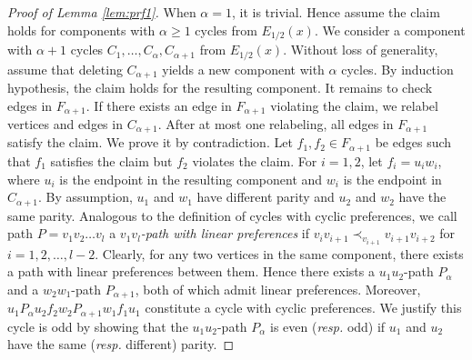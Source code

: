 \documentclass[11pt]{article}
\numberwithin{theorem}{section}
\begin{document}
\begin{proof}[Proof of Lemma \ref{lem:prf1}]
When $\alpha=1$, it is trivial.
Hence assume the claim holds for components with $\alpha\geq 1$ cycles from $E_{1/2}(x)$. We consider a component with $\alpha +1$ cycles $C_1, \ldots, C_{\alpha}, C_{\alpha+1}$ from $E_{1/2}(x)$. 
Without loss of generality, assume that deleting $C_{\alpha+1}$ yields a new component with $\alpha$ cycles.
By induction hypothesis, the claim holds for the resulting component. 
It remains to check edges in $F_{\alpha+1}$. If there exists an edge in $F_{\alpha+1}$ violating the claim, we relabel vertices and edges in $C_{\alpha+1}$. After at most one relabeling, all edges in $F_{\alpha+1}$ satisfy the claim. We prove it by contradiction. Let $f_1,f_2 \in F_{\alpha +1}$ be edges such that $f_1$ satisfies the claim but $f_2$ violates the claim. For $i=1,2$, let $f_i=u_i w_i$, where $u_i$ is the endpoint in the resulting component and $w_i$ is the endpoint in $C_{\alpha+1}$. By assumption, $u_1$ and $w_1$ have different parity and $u_2$ and $w_2$ have the same parity.
Analogous to the definition of cycles with cyclic preferences, we call path $P=v_1 v_2 \ldots v_l$ a \textit{$v_1 v_l$-path with linear preferences} if $v_iv_{i+1}\prec_{v_{i+1}}v_{i+1}v_{i+2}$ for $i=1,2,\ldots,l-2$. Clearly, for any two vertices in the same component, there exists a path with linear preferences between them.
Hence there exists a $u_1 u_2$-path $P_\alpha$ and a $w_2 w_1$-path $P_{\alpha+1}$, both of which admit linear preferences.
Moreover, $u_1 P_\alpha u_2 f_2 w_2 P_{\alpha+1} w_1 f_1 u_1$ constitute a cycle with cyclic preferences. We justify this cycle is odd by 
showing that the $u_1 u_2$-path $P_\alpha$ is even (\textit{resp.} odd) if $u_1$ and $u_2$ have the same (\textit{resp.} different) parity.


\end{proof}
\end{document}
